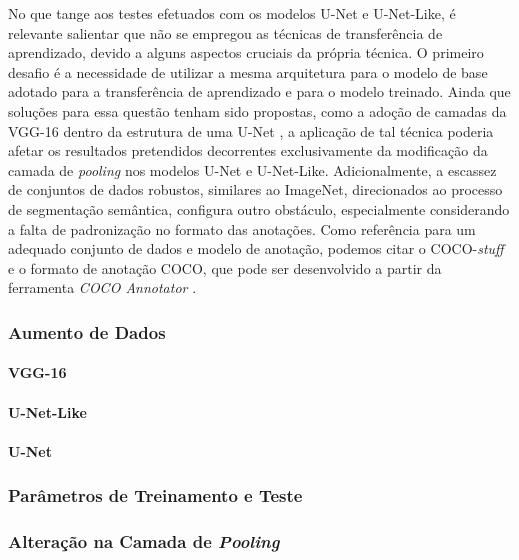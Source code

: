 No que tange aos testes efetuados com os modelos U-Net e U-Net-Like, é relevante salientar que não se empregou as técnicas de transferência de aprendizado, devido a alguns aspectos cruciais da própria técnica. O primeiro desafio é a necessidade de utilizar a mesma arquitetura para o modelo de base adotado para a transferência de aprendizado e para o modelo treinado. Ainda que soluções para essa questão tenham sido propostas, como a adoção de camadas da VGG-16 dentro da estrutura de uma U-Net \citep{Pravitasari2020UNet-VGG16Segmentation}, a aplicação de tal técnica poderia afetar os resultados pretendidos decorrentes exclusivamente da modificação da camada de \textit{pooling} nos modelos U-Net e U-Net-Like. Adicionalmente, a escassez de conjuntos de dados robustos, similares ao ImageNet, direcionados ao processo de segmentação semântica, configura outro obstáculo, especialmente considerando a falta de padronização no formato das anotações. Como referência para um adequado conjunto de dados e modelo de anotação, podemos citar o COCO-\textit{stuff} \citep{Caesar2016} e o formato de anotação COCO, que pode ser desenvolvido a partir da ferramenta \textit{COCO Annotator} \citep{Brooks2019COCOAnnotator}.

\subsubsection{Aumento de Dados}
\label{project:augment}

\paragraph{VGG-16}

\paragraph{U-Net-Like}

\paragraph{U-Net}

\subsubsection{Parâmetros de Treinamento e Teste}
\label{project:params}


\subsubsection{Alteração na Camada de \textit{Pooling}}
\label{project:change_pooling}


